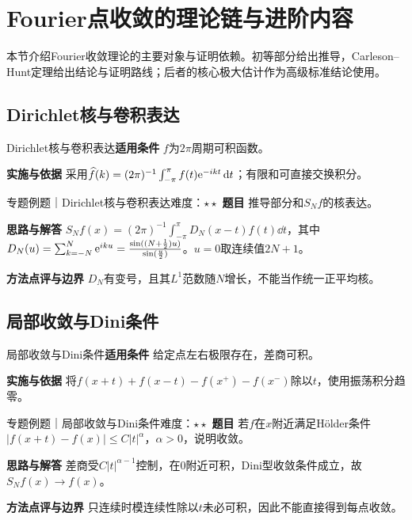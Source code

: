 \section{Fourier点收敛的理论链与进阶内容}\label{mat:fourier_advanced}
\begin{examtip}本节介绍Fourier收敛理论的主要对象与证明依赖。初等部分给出推导，Carleson--Hunt定理给出结论与证明路线；后者的核心极大估计作为高级标准结论使用。\end{examtip}
\subsection{Dirichlet核与卷积表达}\label{mat:fourier_advanced:kernel}
\begin{method}{Dirichlet核与卷积表达}\textbf{适用条件} $f$为$2\pi$周期可积函数。\par\textbf{实施与依据} 采用$\widehat f(k)=(2\pi)^{-1}\int_{-\pi}^{\pi}f(t)\mathrm{e}^{-ikt}\mathop{}\!\mathrm{d} t$；有限和可直接交换积分。\end{method}
\begin{example}{专题例题｜Dirichlet核与卷积表达}{难度：$\star\star$}
\textbf{题目} 推导部分和$S_Nf$的核表达。\par\textbf{思路与解答} $S_Nf(x)=(2\pi)^{-1}\int_{-\pi}^{\pi}D_N(x-t)f(t)\dd t$，其中$D_N(u)=\sum_{k=-N}^N\mathrm{e}^{iku}=\frac{\sin((N+\frac{1}{2})u)}{\sin(\frac{u}{2})}$。$u=0$取连续值$2N+1$。\par\textbf{方法点评与边界} $D_N$有变号，且其$L^1$范数随$N$增长，不能当作统一正平均核。
\end{example}
\subsection{局部收敛与Dini条件}\label{mat:fourier_advanced:localization}
\begin{method}{局部收敛与Dini条件}\textbf{适用条件} 给定点左右极限存在，差商可积。\par\textbf{实施与依据} 将$f(x+t)+f(x-t)-f(x^+)-f(x^-)$除以$t$，使用振荡积分趋零。\end{method}
\begin{example}{专题例题｜局部收敛与Dini条件}{难度：$\star\star$}
\textbf{题目} 若$f$在$x$附近满足Hölder条件$|f(x+t)-f(x)|\le C|t|^\alpha$，$\alpha>0$，说明收敛。\par\textbf{思路与解答} 差商受$C|t|^{\alpha-1}$控制，在0附近可积，Dini型收敛条件成立，故$S_Nf(x)\to f(x)$。\par\textbf{方法点评与边界} 只连续时模连续性除以$t$未必可积，因此不能直接得到每点收敛。
\end{example}

